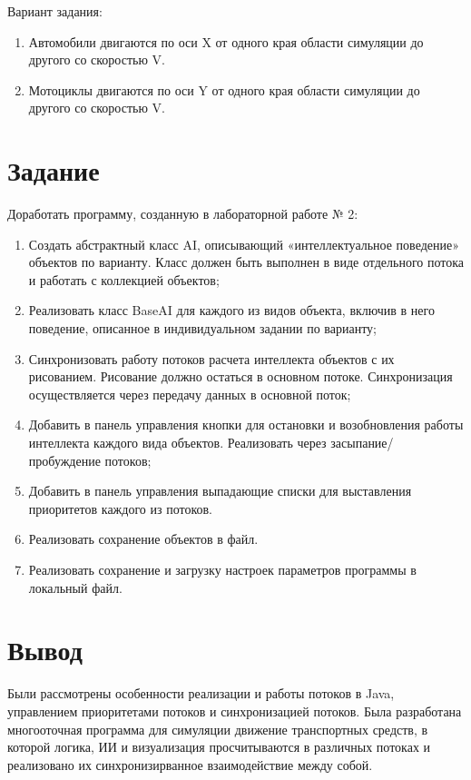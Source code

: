 \documentclass{article}
\begin{document}
Вариант задания:
\begin{enumerate}
\item Автомобили двигаются по оси X от одного края области симуляции до другого со скоростью V.
\item Мотоциклы двигаются по оси Y от одного края области симуляции до другого со скоростью V.
\end{enumerate}
\section*{Задание}

Доработать программу, созданную в лабораторной работе № 2:
\begin{enumerate}

\item Создать абстрактный класс AI, описывающий «интеллектуальное поведение» объектов по варианту. Класс должен быть выполнен в виде отдельного потока и работать с коллекцией объектов;
\item Реализовать класс BaseAI для каждого из видов объекта, включив в него поведение, описанное в индивидуальном задании по варианту;
\item Синхронизовать работу потоков расчета интеллекта объектов с их рисованием. Рисование должно остаться в основном потоке. Синхронизация осуществляется через передачу данных в основной поток;
\item Добавить в панель управления кнопки для остановки и возобновления работы интеллекта каждого вида объектов. Реализовать через засыпание/пробуждение потоков;
\item Добавить в панель управления выпадающие списки для выставления приоритетов каждого из потоков.
\item Реализовать сохранение объектов в файл.
\item Реализовать сохранение и загрузку настроек параметров программы в локальный файл.

\end{enumerate}

\section*{Вывод}
Были рассмотрены особенности реализации и работы потоков в Java, управлением приоритетами потоков и синхронизацией потоков.
Была разработана многооточная программа для симуляции движение транспортных средств, в которой логика, ИИ и визуализация
просчитываются в различных потоках и реализовано их синхронизирванное взаимодействие между собой.
\end{document}
